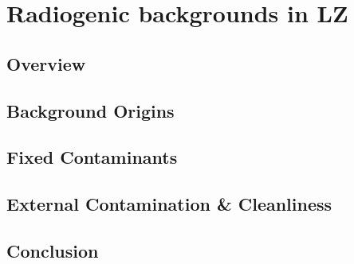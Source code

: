 \chapter{Radiogenic backgrounds in LZ}
\label{chap:chap3}

\section{Overview}

\section{Background Origins}
\label{sec:bkgorigins}

\section{Fixed Contaminants}
\label{sec:fixed}

\section{External Contamination \& Cleanliness}
\label{sec:cleanliness}

\section{Conclusion}